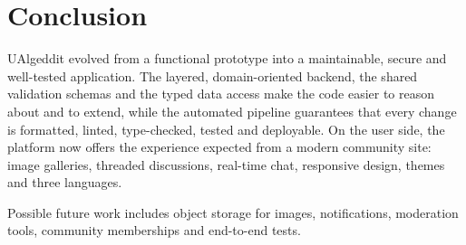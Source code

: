 \documentclass[11pt,a4paper]{article}
\begin{document}
\section{Conclusion}

UAlgeddit evolved from a functional prototype into a maintainable, secure and well-tested application. The layered,
domain-oriented backend, the shared validation schemas and the typed data access make the code easier to reason
about and to extend, while the automated pipeline guarantees that every change is formatted, linted, type-checked,
tested and deployable. On the user side, the platform now offers the experience expected from a modern community
site: image galleries, threaded discussions, real-time chat, responsive design, themes and three languages.

Possible future work includes object storage for images, notifications, moderation tools, community
memberships and end-to-end tests.
\end{document}
